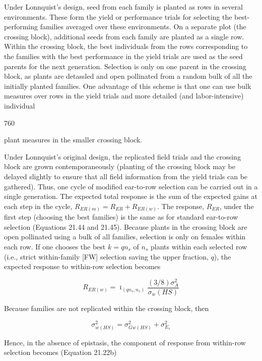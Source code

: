 \documentclass{article}
\begin{document}
Under Lonnquist's design, seed from each family is planted as rows in several environments. These form the yield or performance trials for selecting the best-performing families averaged over these environments. On a separate plot (the crossing block), additional seeds from each family are planted as a single row. Within the crossing block, the best individuals from the rows corresponding to the families with the best performance in the yield trials are used as the seed parents for the next generation. Selection is only on one parent in the crossing block, as plants are detassled and open pollinated from a random bulk of all the initially planted families. One advantage of this scheme is that one can use bulk measures over rows in the yield trials and more detailed (and labor-intensive) individual

760

plant measures in the smaller crossing block.

Under Lonnquist's original design, the replicated field trials and the crossing block are grown contemporaneously (planting of the crossing block may be delayed slightly to ensure that all field information from the yield trials can be gathered). Thus, one cycle of modified ear-to-row selection can be carried out in a single generation. The expected total response is the sum of the expected gains at each step in the cycle,  $ R_{ER(m)} = R_{ER} + R_{ER(w)} $. The response,  $ R_{ER} $, under the first step (choosing the best families) is the same as for standard ear-to-row selection (Equations 21.44 and 21.45). Because plants in the crossing block are open pollinated using a bulk of all families, selection is only on females within each row. If one chooses the best  $ k = qn_s $ of  $ n_s $ plants within each selected row (i.e., strict within-family [FW] selection saving the upper fraction,  $ q $), the expected response to within-row selection becomes

\begin{equation}
R_{ER(w)}=\overline{\imath}_{(qn_{s},n_{s})}\frac{(3/8)\sigma_{A}^{2}}{\sigma_{w}(HS)}
\tag{21.46}
\label{eq:21_46}
\end{equation}

Because families are not replicated within the crossing block, then

\begin{equation}
\sigma_{w(HS)}^{2}=\sigma_{Gw(HS)}^{2}+\sigma_{E_{s}}^{2}
\end{equation}

Hence, in the absence of epistasis, the component of response from within-row selection becomes (Equation 21.22b)
\end{document}
